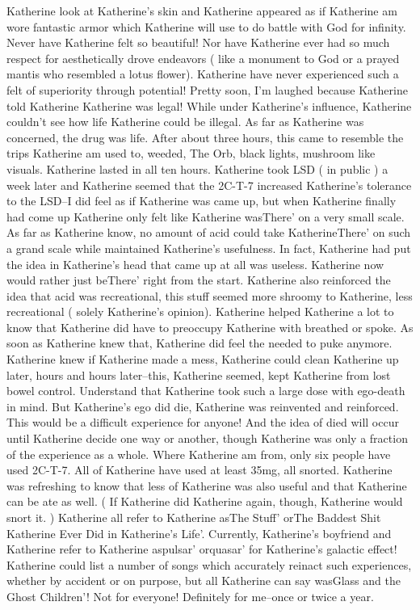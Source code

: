 \documentclass[12pt]{book}
\begin{document}
Katherine look at Katherine's skin and Katherine appeared as if Katherine am wore fantastic armor which Katherine will use to do battle with God for infinity. Never have Katherine felt so beautiful! Nor have Katherine ever had so much respect for aesthetically drove endeavors ( like a monument to God or a prayed mantis who resembled a lotus flower). Katherine have never experienced such a felt of superiority through potential! Pretty soon, I'm laughed because Katherine told Katherine Katherine was legal! While under Katherine's influence, Katherine couldn't see how life Katherine could be illegal. As far as Katherine was concerned, the drug was life. After about three hours, this came to resemble the trips Katherine am used to, weeded, The Orb, black lights, mushroom like visuals. Katherine lasted in all ten hours. Katherine took LSD ( in public ) a week later and Katherine seemed that the 2C-T-7 increased Katherine's tolerance to the LSD--I did feel as if Katherine was came up, but when Katherine finally had come up Katherine only felt like Katherine wasThere' on a very small scale. As far as Katherine know, no amount of acid could take KatherineThere' on such a grand scale while maintained Katherine's usefulness. In fact, Katherine had put the idea in Katherine's head that came up at all was useless. Katherine now would rather just beThere' right from the start. Katherine also reinforced the idea that acid was recreational, this stuff seemed more shroomy to Katherine, less recreational ( solely Katherine's opinion). Katherine helped Katherine a lot to know that Katherine did have to preoccupy Katherine with breathed or spoke. As soon as Katherine knew that, Katherine did feel the needed to puke anymore. Katherine knew if Katherine made a mess, Katherine could clean Katherine up later, hours and hours later--this, Katherine seemed, kept Katherine from lost bowel control. Understand that Katherine took such a large dose with ego-death in mind. But Katherine's ego did die, Katherine was reinvented and reinforced. This would be a difficult experience for anyone! And the idea of died will occur until Katherine decide one way or another, though Katherine was only a fraction of the experience as a whole. Where Katherine am from, only six people have used 2C-T-7. All of Katherine have used at least 35mg, all snorted. Katherine was refreshing to know that less of Katherine was also useful and that Katherine can be ate as well. ( If Katherine did Katherine again, though, Katherine would snort it. ) Katherine all refer to Katherine asThe Stuff' orThe Baddest Shit Katherine Ever Did in Katherine's Life'. Currently, Katherine's boyfriend and Katherine refer to Katherine aspulsar' orquasar' for Katherine's galactic effect! Katherine could list a number of songs which accurately reinact such experiences, whether by accident or on purpose, but all Katherine can say wasGlass and the Ghost Children'! Not for everyone! Definitely for me--once or twice a year.
\end{document}
